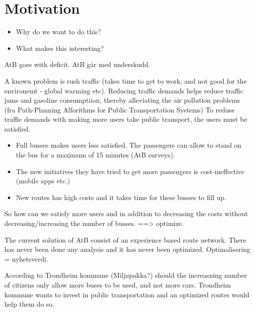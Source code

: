 \section{Motivation}
\begin{itemize}
\item Why do we want to do this?
\item What makes this interesting?
\end{itemize}

AtB goes with deficit. AtB går med underskudd. \par
A known problem is rush traffic (takes time to get to work, and not good for the environemt - global warming etc). Reducing traffic demands helps reduce traffic jams and gasoline consumptiion, thereby alleviating the air pollution problems (fra Path-Planning Alforithms for Public Transportation Systems) To reduse traffic demands with making more
users take public transport, the users must be satisfied. 
\begin{itemize}
\item Full busses makes users less satisfied. The passengers can allow to stand on the bus for a maximum of 15 minutes (AtB surveys). 
\item The new initiatives they have tried to get more passengers is cost-ineffective (mobile apps etc.) 
\item New routes has high costs and it takes time for these busses to fill up. 
\end{itemize}
\par
So how can we satisfy more users and in addition to decreasing the costs without decreasing/increasing the number of busses. ==> optimize. 
\par
The current solution of AtB consist of an experience based route network. There has never been done any analysis and it has never been optimized. Optimalisering = nyhetsverdi.
\par
According to Trondheim kommune (Miljøpakka?) should the increasning number of citizens only allow more buses to be used, and not more cars. Trondheim kommune wants to invest in public transportation and an optimized routes would help them do so. 




